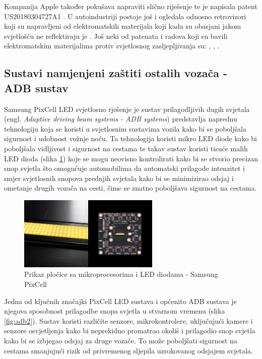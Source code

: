 \documentclass{foi}
\begin{document}
Kompanija Apple također pokušava napraviti slično riješenje te je napisala patent \newline US20180304727A1 \cite{OwenMal2018} \cite{Apple2016}. U autoindustriji postoje još i ogledala odnosno retrovizori koji su napravljeni od elektromatskih materijala koji kada su obasjani jakom svjetlošću ne reflektiraju je \cite{Autoevolution2022}. Još neki od patenata i radova koji su bavili elektromatskim materijalima protiv svjetlosnog zasljepljivanja su: \cite{KumarB2020}, \cite{Dewayne}, \cite{Yuter2010}.

\subsection{Sustavi namjenjeni zaštiti ostalih vozača - ADB sustav}

Samsung PixCell LED svjetlosno rješenje je sustav prilagodljivih dugih svjetala (engl. \emph{Adaptive driving beam systems - ADB systems}) predstavlja naprednu tehnologiju koja se koristi u svjetlosnim sustavima vozila kako bi se poboljšala sigurnost i udobnost vožnje noću. Ta tehnologija koristi mikro LED diode kako bi poboljšala vidljivost i sigurnost na cestama te takav sustav koristi tisuće malih LED dioda (slika \ref{fig:adb}) koje se mogu neovisno kontrolirati kako bi se stvorio precizan snop svjetla što omogućuje automobilima da automatski prilagode intenzitet i smjer svjetlosnih snopova prednjih svjetala kako bi se minimizirao odsjaj i ometanje drugih vozača na cesti, čime se znatno poboljšava sigurnost na cestama. \cite{Samsung2021}

\begin{figure}[h!]
    \centering
    \includegraphics[width=0.6\textwidth]{slike/adb}
    \caption{Prikaz pločice sa mikroprocesorima i LED diodama - Samsung PixCell \cite{Samsung2021}}
    \label{fig:adb}
\end{figure}

Jedna od ključnih značajki PixCell LED sustava i općenito ADB sustava je njegova sposobnost prilagodbe snopa svjetla u stvarnom vremenu (slika \ref{fig:adb2}). Sustav koristi različite senzore, mikrokontrolere, uključujući kamere i senzore osvjetljenja kako bi neprekidno promatrao okoliš i prilagodio snop svjetla kako bi se izbjegao odsjaj za druge vozače. To može poboljšati sigurnost na cestama smanjujući rizik od privremenog sljepila uzrokovanog odsjajem svjetala. \cite{Samsung2021}
\end{document}
